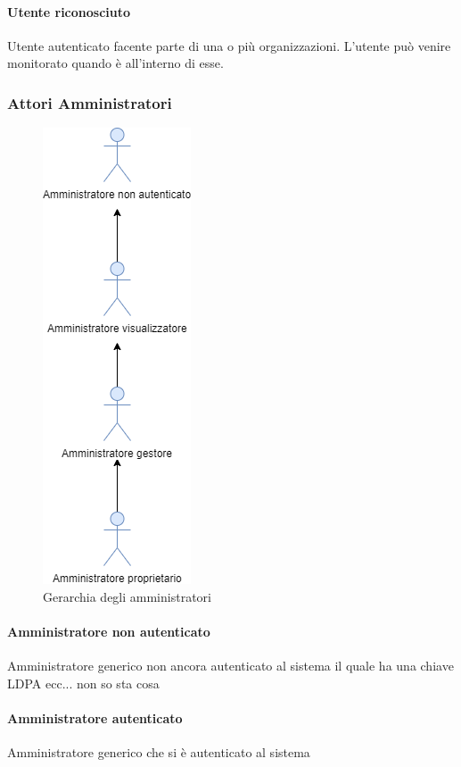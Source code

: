 \paragraph{Utente riconosciuto}
Utente autenticato facente parte di una o più organizzazioni.
L'utente può venire monitorato quando è all'interno di esse.



\subsubsection{Attori Amministratori}
\begin{figure}[h]
  \caption{Gerarchia degli amministratori}
  \centering
    \includegraphics[scale=0.6]{sezioni/UseCase/Immagini/Amministratori.png}
\end{figure}


\paragraph{Amministratore non autenticato}
Amministratore generico non ancora autenticato al sistema il quale ha una chiave LDPA ecc... non so sta cosa
\paragraph{Amministratore autenticato}
Amministratore generico che si è autenticato al sistema
